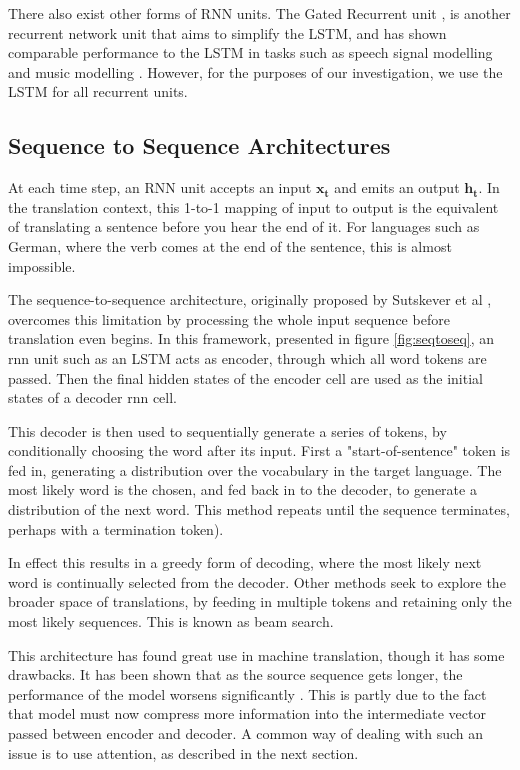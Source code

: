 There also exist other forms of RNN units. The Gated Recurrent unit \cite{cho_properties_2014}, is another recurrent network unit that aims to simplify the LSTM, and has shown comparable performance to the LSTM in tasks such as speech signal modelling and music modelling \cite{chung_empirical_2014}.
However, for the purposes of our investigation, we use the LSTM for all recurrent units.


\subsection{Sequence to Sequence Architectures} %
\label{sub:sequence_to_sequence_architectures}

At each time step, an RNN unit accepts an input $\mathbf{x_t}$ and emits an output $\mathbf{h_t}$. In the translation context, this 1-to-1 mapping of input to output is the equivalent of translating a sentence before you hear the end of it. For languages such as German, where the verb comes at the end of the sentence, this is almost impossible.

The sequence-to-sequence architecture, originally proposed by Sutskever et al \cite{sutskever_sequence_2014}, overcomes this limitation by processing the whole input sequence before translation even begins. 
In this framework, presented in figure \ref{fig:seqtoseq}, an rnn unit such as an LSTM acts as encoder, through which all word tokens are passed. Then the final hidden states of the encoder cell are used as the initial states of a decoder rnn cell.

This decoder is then used to sequentially generate a series of tokens, by conditionally choosing the word after its input. First a "start-of-sentence" token is fed in, generating a distribution over the vocabulary in the target language. The most likely word is the chosen, and fed back in to the  decoder, to generate a distribution of the next word. This method repeats until the sequence terminates, perhaps with a termination token).

In effect this results in a greedy form of decoding, where the most likely next word is continually selected from the decoder.  Other methods seek to explore the broader space of translations, by feeding in multiple tokens and retaining only the most likely sequences. This is known as beam search.

This architecture has found great use in machine translation, though it has some drawbacks. It has been shown that as the source sequence gets longer, the performance of the model worsens significantly \cite{cho_properties_2014}. This is partly due to the fact that model must now compress more information into the intermediate vector passed between encoder and decoder. A common way of dealing with such an issue is to use attention, as described in the next section. 

